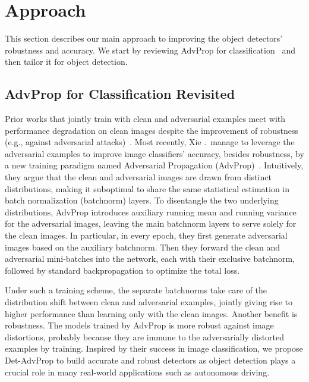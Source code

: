 \documentclass[final]{cvpr}
\begin{document}
\section{Approach}
This section describes our main approach to improving the object detectors' robustness and accuracy. We start by reviewing AdvProp for classification~\cite{xie2020advprop} and then tailor it for object detection.

\subsection{AdvProp for Classification Revisited}
Prior works that jointly train with clean and adversarial examples meet with performance degradation on clean images despite the improvement of robustness (e.g., against adversarial attacks)~\cite{madry2018towards, kurakin2017adversarial, zhang2019trades}.
Most recently, Xie \etal.\ manage to leverage the adversarial examples to improve image classifiers' accuracy, besides robustness,  by a new training paradigm named Adversarial Propagation (AdvProp)~\cite{xie2020advprop}.
Intuitively, they argue that the clean and adversarial images are drawn from distinct distributions, making it suboptimal to share the same statistical estimation in batch normalization (batchnorm) layers.
To disentangle the two underlying distributions, AdvProp introduces auxiliary running mean and running variance for the adversarial images, leaving the main batchnorm layers to serve solely for the clean images.
In particular, in every epoch, they first generate adversarial images based on the auxiliary batchnorm.
Then they forward the clean and adversarial mini-batches into the network, each with their exclusive batchnorm, followed by standard backpropagation to optimize the total loss.

Under such a training scheme, the separate batchnorms take care of the distribution shift between clean and adversarial examples, jointly giving rise to higher performance than learning only with the clean images. 
Another benefit is robustness. The models trained by AdvProp is more robust against image distortions, probably because they are immune to the adversarially distorted examples by training.
Inspired by their success in image classification, we propose Det-AdvProp to build accurate and robust detectors as object detection plays a crucial role in many real-world applications such as autonomous driving.
\end{document}
